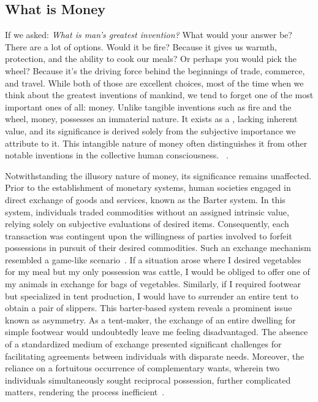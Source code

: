 \subsection{What is Money}
If we asked: \textit{What is man's greatest invention?} What would your answer be? There are a lot of options. Would it be fire?
Because it gives us warmth, protection, and the ability to cook our meals? Or perhaps you would pick the wheel? Because it's the driving force behind the
beginnings of trade, commerce, and travel. While both of those are excellent choices, most of the time when we think about the greatest inventions of
mankind, we tend to forget one of the most important ones of all: money. Unlike tangible inventions such as fire and the wheel, money, possesses an
immaterial nature. It exists as a , lacking inherent value, and its significance is derived solely from the subjective importance we
attribute to it. This intangible nature of money often distinguishes it from other notable inventions in the collective human consciousness.
~\cite{smith2010wealth}.

Notwithstanding the illusory nature of money, its significance remains unaffected. Prior to the establishment of monetary systems, human
societies engaged in direct exchange of goods and services, known as the Barter system. In this system, individuals traded commodities without
an assigned intrinsic value, relying solely on subjective evaluations of desired items. Consequently, each transaction was contingent upon
the willingness of parties involved to forfeit possessions in pursuit of their desired commodities. Such an exchange mechanism resembled a
game-like scenario~\cite{durlauf2016new}. If a situation arose where I desired vegetables for my meal but my only possession was cattle,
I would be obliged to offer one of my animals in exchange for bags of vegetables. Similarly, if I required footwear but specialized in tent
production, I would have to surrender an entire tent to obtain a pair of slippers. This barter-based system reveals a prominent issue known
as asymmetry. As a tent-maker, the exchange of an entire dwelling for simple footwear would undoubtedly leave me feeling disadvantaged. The
absence of a standardized medium of exchange presented significant challenges for facilitating agreements between individuals with disparate
needs. Moreover, the reliance on a fortuitous occurrence of complementary wants, wherein two individuals simultaneously sought reciprocal
possession, further complicated matters, rendering the process inefficient~\cite{goodhart1998two}.

